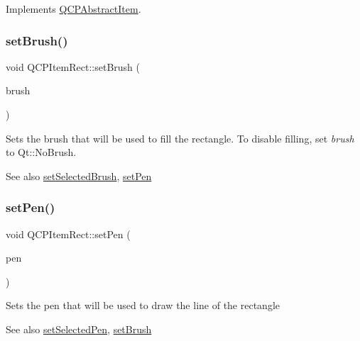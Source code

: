 Implements \mbox{\hyperlink{class_q_c_p_abstract_item_ae41d0349d68bb802c49104afd100ba2a}{Q\+C\+P\+Abstract\+Item}}.

\mbox{\label{class_q_c_p_item_rect_abbd4e346a03513ee466afc25d9c75446}} 
\subsubsection{\texorpdfstring{setBrush()}{setBrush()}}
{\footnotesize\ttfamily void Q\+C\+P\+Item\+Rect\+::set\+Brush (\begin{DoxyParamCaption}\item[{const Q\+Brush \&}]{brush }\end{DoxyParamCaption})}

Sets the brush that will be used to fill the rectangle. To disable filling, set {\itshape brush} to Qt\+::\+No\+Brush.

\begin{DoxySeeAlso}{See also}
\mbox{\hyperlink{class_q_c_p_item_rect_abd1792859844118dedee86223cede7af}{set\+Selected\+Brush}}, \mbox{\hyperlink{class_q_c_p_item_rect_a483c0da5a17e1646cd17ddea2c124e7d}{set\+Pen}} 
\end{DoxySeeAlso}
\mbox{\label{class_q_c_p_item_rect_a483c0da5a17e1646cd17ddea2c124e7d}} 
\subsubsection{\texorpdfstring{setPen()}{setPen()}}
{\footnotesize\ttfamily void Q\+C\+P\+Item\+Rect\+::set\+Pen (\begin{DoxyParamCaption}\item[{const Q\+Pen \&}]{pen }\end{DoxyParamCaption})}

Sets the pen that will be used to draw the line of the rectangle

\begin{DoxySeeAlso}{See also}
\mbox{\hyperlink{class_q_c_p_item_rect_a52a1bcb2dc753a538e406a2ba3cf21ce}{set\+Selected\+Pen}}, \mbox{\hyperlink{class_q_c_p_item_rect_abbd4e346a03513ee466afc25d9c75446}{set\+Brush}} 
\end{DoxySeeAlso}
\mbox{\label{class_q_c_p_item_rect_abd1792859844118dedee86223cede7af}} 
